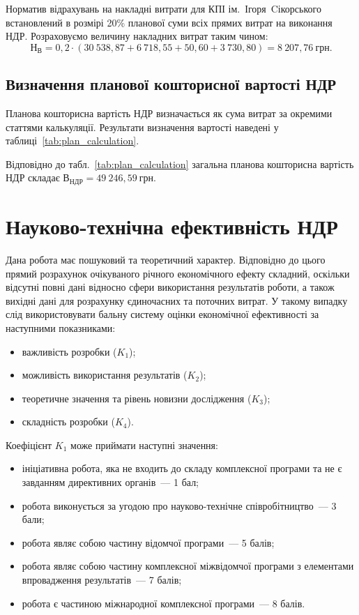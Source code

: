 \documentclass[a4paper,fontsize=14bp,ukrainian]{extreport}
\begin{document}
Норматив відрахувань на накладні витрати для КПІ ім.~Ігоря~Cікорського встановлений в розмірі 20\% планової суми всіх прямих витрат на виконання НДР. Розраховуємо величину накладних витрат таким чином:
\begin{equation*}
\text{Н}_{\text{В}} = 0,2 \cdot (30~538,87+6~718,55+50,60+3~730,80)= 8~207,76~\text{грн}.
\end{equation*}

\subsection{Визначення планової кошторисної вартості НДР}

\enlargethispage{1\baselineskip}
Планова кошторисна вартість НДР визначається як сума витрат за окремими статтями калькуляції. Результати визначення вартості наведені у таблиці~\ref{tab:plan_calculation}.



Відповідно до табл.~\ref{tab:plan_calculation} загальна планова кошторисна вартість НДР складає $\text{В}_{\text{НДР}}=49~246,59~\text{грн}$.

\section{Науково-технічна ефективність НДР}

Дана робота має пошуковий та теоретичний характер. Відповідно до цього прямий розрахунок очікуваного річного економічного ефекту складний, оскільки відсутні повні дані відносно сфери використання результатів роботи, а також вихідні дані для розрахунку єдиночасних та поточних витрат. У такому випадку слід використовувати бальну систему оцінки економічної ефективності за наступними показниками:
\begin{itemize}
\item важливість розробки ($K_1$);
\item можливість використання результатів ($K_2$);
\item теоретичне значення та рівень новизни дослідження ($K_3$);
\item складність розробки ($K_4$).
\end{itemize}

Коефіцієнт $K_1$ може приймати наступні значення:
\begin{itemize}
\item ініціативна робота, яка не входить до складу комплексної програми та не є завданням директивних органів~--- 1 бал;
\item робота виконується за угодою про науково-технічне співробітництво~--- 3 бали;
\item робота являє собою частину відомчої програми~--- 5 балів;
\item робота являє собою частину комплексної міжвідомчої програми з елементами впровадження результатів~--- 7 балів;
\item робота є частиною міжнародної комплексної програми~--- 8 балів.
\end{itemize}
\end{document}
